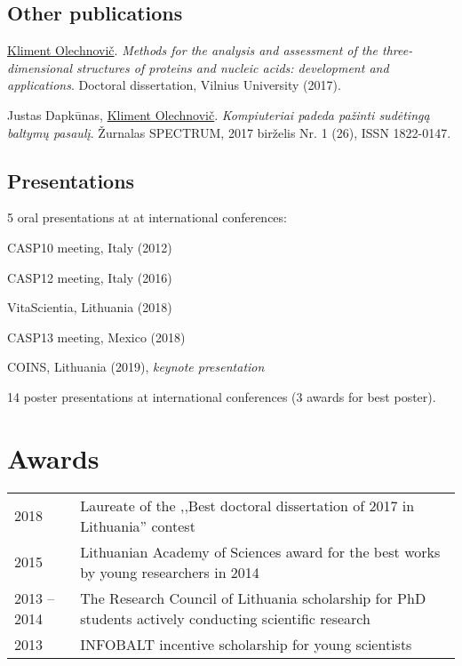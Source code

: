 \documentclass{article}
\newenvironment{itemize_tight}{
\begin{itemize}
  \setlength{\itemsep}{2pt}
  \setlength{\parskip}{0pt}
  \setlength{\parsep}{0pt}
}{\end{itemize}}
\begin{document}
\subsection*{Other publications}
\begin{itemize_tight}
  \item \underline{Kliment Olechnovič}.
        \emph{Methods for the analysis and assessment of the three-dimensional structures of proteins and nucleic acids: development and applications}.
        Doctoral dissertation, Vilnius University (2017).
  \item Justas Dapkūnas, \underline{Kliment Olechnovič}.
        \emph{Kompiuteriai padeda pažinti sudėtingą baltymų pasaulį}.
        Žurnalas SPECTRUM, 2017 birželis Nr. 1 (26), ISSN 1822-0147.
\end{itemize_tight}

\subsection*{Presentations}
\begin{itemize_tight}
  \item 5 oral presentations at at international conferences:
    \begin{itemize_tight}
      \item CASP10 meeting, Italy (2012)
      \item CASP12 meeting, Italy (2016)
      \item VitaScientia, Lithuania (2018)
      \item CASP13 meeting, Mexico (2018)
      \item COINS, Lithuania (2019), \emph{keynote presentation}
    \end{itemize_tight}
  \item 14 poster presentations at international conferences (3 awards for best poster).
\end{itemize_tight}


\section*{Awards}
\begin{tabular}{p{}p{}}
2018 & Laureate of the ,,Best doctoral dissertation of 2017 in Lithuania'' contest \\
2015 & Lithuanian Academy of Sciences award for the best works by young researchers in 2014 \\
2013 -- 2014 & The Research Council of Lithuania scholarship for PhD students actively conducting scientific research \\
2013 & INFOBALT incentive scholarship for young scientists
\end{tabular}
\end{document}
